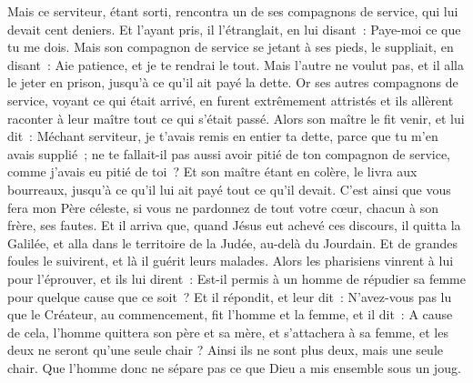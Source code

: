 \begin{multicols}{2}
Mais ce serviteur, étant sorti, rencontra un de ses compagnons de service, qui lui devait cent deniers. Et l'ayant pris, il l'étranglait, en lui disant~: Paye-moi ce que tu me dois.
Mais son compagnon de service se jetant à ses pieds, le suppliait, en disant~: Aie patience, et je te rendrai le tout.
Mais l'autre ne voulut pas, et il alla le jeter en prison, jusqu'à ce qu'il ait payé la dette.
Or ses autres compagnons de service, voyant ce qui était arrivé, en furent extrêmement attristés et ils allèrent raconter à leur maître tout ce qui s'était passé.
Alors son maître le fit venir, et lui dit~: Méchant serviteur, je t'avais remis en entier ta dette, parce que tu m'en avais supplié~;
ne te fallait-il pas aussi avoir pitié de ton compagnon de service, comme j'avais eu pitié de toi~?
Et son maître étant en colère, le livra aux bourreaux, jusqu'à ce qu'il lui ait payé tout ce qu'il devait.
C'est ainsi que vous fera mon Père céleste, si vous ne pardonnez de tout votre cœur, chacun à son frère, ses fautes.
\VerseOne{}Et il arriva que, quand Jésus eut achevé ces discours, il quitta la Galilée, et alla dans le territoire de la Judée, au-delà du Jourdain.
Et de grandes foules le suivirent, et là il guérit leurs malades.
Alors les pharisiens vinrent à lui pour l'éprouver, et ils lui dirent~: Est-il permis à un homme de répudier sa femme pour quelque cause que ce soit~?
Et il répondit, et leur dit~: N'avez-vous pas lu que le Créateur, au commencement, fit l'homme et la femme,
et il dit~: A cause de cela, l'homme quittera son père et sa mère, et s'attachera à sa femme, et les deux ne seront qu'une seule chair ?
Ainsi ils ne sont plus deux, mais une seule chair. Que l'homme donc ne sépare pas ce que Dieu a mis ensemble sous un joug.

\end{multicols}
